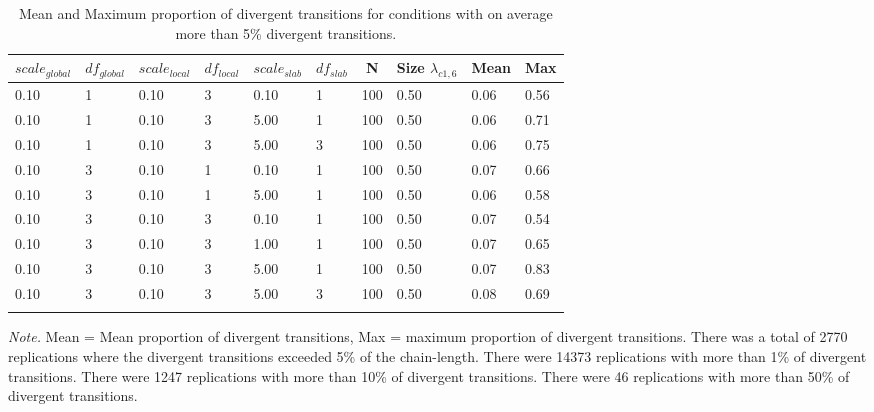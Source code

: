 \documentclass[
  man, donotrepeattitle,floatsintext]{apa6}
\begin{document}
\begin{table}[tbp]

\begin{center}
\begin{threeparttable}

\caption{\label{tab:unnamed-chunk-4}Mean and Maximum proportion of divergent transitions for conditions with on average more than 5\% divergent transitions.}

\begin{tabular}{llllllllll}
\toprule
$scale_{global}$ & \multicolumn{1}{c}{$df_{global}$} & \multicolumn{1}{c}{$scale_{local}$} & \multicolumn{1}{c}{$df_{local}$} & \multicolumn{1}{c}{$scale_{slab}$} & \multicolumn{1}{c}{$df_{slab}$} & \multicolumn{1}{c}{N} & \multicolumn{1}{c}{Size $\lambda_{c1 , 6}$} & \multicolumn{1}{c}{Mean} & \multicolumn{1}{c}{Max}\\
\midrule
0.10 & 1 & 0.10 & 3 & 0.10 & 1 & 100 & 0.50 & 0.06 & 0.56\\
0.10 & 1 & 0.10 & 3 & 5.00 & 1 & 100 & 0.50 & 0.06 & 0.71\\
0.10 & 1 & 0.10 & 3 & 5.00 & 3 & 100 & 0.50 & 0.06 & 0.75\\
0.10 & 3 & 0.10 & 1 & 0.10 & 1 & 100 & 0.50 & 0.07 & 0.66\\
0.10 & 3 & 0.10 & 1 & 5.00 & 1 & 100 & 0.50 & 0.06 & 0.58\\
0.10 & 3 & 0.10 & 3 & 0.10 & 1 & 100 & 0.50 & 0.07 & 0.54\\
0.10 & 3 & 0.10 & 3 & 1.00 & 1 & 100 & 0.50 & 0.07 & 0.65\\
0.10 & 3 & 0.10 & 3 & 5.00 & 1 & 100 & 0.50 & 0.07 & 0.83\\
0.10 & 3 & 0.10 & 3 & 5.00 & 3 & 100 & 0.50 & 0.08 & 0.69\\
\bottomrule
\addlinespace
\end{tabular}

\begin{tablenotes}[para]
\normalsize{\textit{Note.} Mean = Mean proportion of divergent transitions, Max = maximum proportion of divergent transitions. There was a total of 2770 replications where the divergent transitions exceeded 5\% of the chain-length. There were 14373 replications with more than 1\% of divergent transitions. There were 1247 replications with more than 10\% of divergent transitions. There were 46 replications with more than 50\% of divergent transitions.}
\end{tablenotes}

\end{threeparttable}
\end{center}

\end{table}
\end{document}
